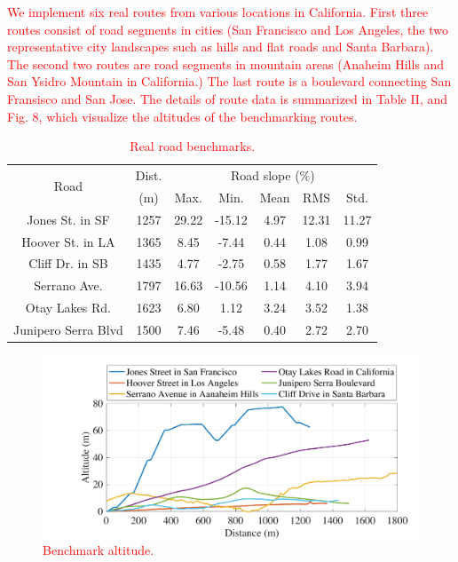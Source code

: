 \documentclass{IEEEtran}
\begin{document}
\textcolor{red}{We implement six real routes from various locations in California. First three routes consist of road segments in cities (San Francisco and Los Angeles, the two representative city landscapes such as hills and flat roads and Santa Barbara). The second two routes are road segments in mountain areas (Anaheim Hills and San Ysidro Mountain in California.) The last route is a boulevard connecting San Fransisco and San Jose. The details of route data is summarized in Table II, and Fig. 8, which visualize the altitudes of the benchmarking routes.}

\begin{table} 
\caption{\textcolor{red}{Real road benchmarks.}}
\centering
\label{table:road_bench}
\begin{tabular}{|c|c|c|c|c|c|c|}  \hline
\multirow{2}{*}{Road} 
				&Dist.		&\multicolumn{5}{|c|}{Road slope (\%)}  \\ \cline{3-7}
				&(m)		 	&Max.		&Min. 	&Mean		&RMS 	&Std.	\\ \hline
Jones St.	in SF		&1257		&29.22		&-15.12	&4.97 		&12.31 	&11.27	\\ \hline
Hoover St. in LA	&1365		&8.45		&-7.44	&0.44		&1.08 	&0.99	\\ \hline
Cliff Dr. in SB		&1435		&4.77		&-2.75	&0.58		&1.77 	&1.67	\\ \hline
Serrano Ave.		&1797		&16.63		&-10.56	&1.14 		&4.10 	&3.94	\\ \hline
Otay Lakes Rd.		&1623		&6.80		&1.12	&3.24		&3.52 	&1.38	\\ \hline
Junipero Serra Blvd	&1500		&7.46		&-5.48	&0.40		&2.72 	&2.70	\\ \hline
\end{tabular}
\end{table}

\begin{figure}	 %
\includegraphics[width=1.0\hsize]{Figures/Benchmark_altitude.pdf}
\caption{\textcolor{red}{Benchmark altitude.}}
\label{fig:bench_altitude}
\end{figure} 
\end{document}
